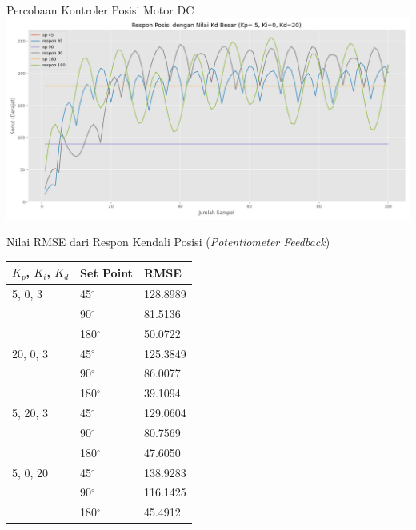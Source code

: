 \documentclass[10pt,xcolor={dvipsnames}]{beamer}
\begin{document}
\begin{frame}{Percobaan Kontroler Posisi Motor DC}
	\centering
	\includegraphics[width=14cm]{Graph/posKdBesar.png}
\end{frame}
\begin{frame}{Nilai RMSE dari Respon Kendali Posisi (\textit{Potentiometer Feedback})}
	\begin{table}[H] 
		\begin{tabular}{| m{3cm} | m{3cm}| m{3cm}|}
			\hline
			\textbf{$K_{p}$, $K_{i}$, $K_{d}$}	& \textbf{Set Point}	& \textbf{RMSE}\\
			\hline 
			5, 0, 3	& 45$^\circ$			& 128.8989\\
			& 90$^\circ$			& 81.5136\\
			& 180$^\circ$			& 50.0722 \\
			\hline
			20, 0, 3	& 45$^\circ$			& 125.3849\\
			& 90$^\circ$			& 86.0077\\
			& 180$^\circ$			& 39.1094\\
			\hline
			5, 20, 3	& 45$^\circ$			& 129.0604\\
			& 90$^\circ$			& 80.7569\\
			& 180$^\circ$			& 47.6050\\
			\hline
			5, 0, 20	& 45$^\circ$			& 138.9283\\
			& 90$^\circ$			& 116.1425\\
			& 180$^\circ$			& 45.4912\\
			\hline
		\end{tabular}
	\end{table}
\end{frame}
\end{document}
